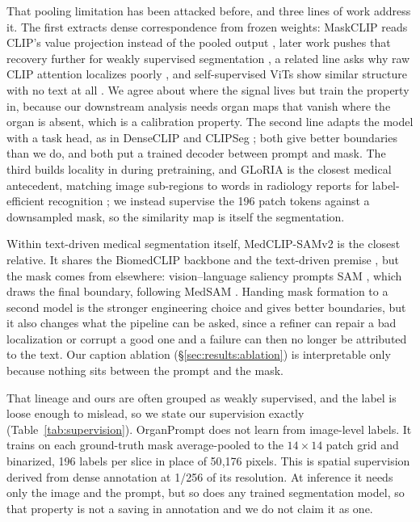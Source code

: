 \documentclass[10pt]{article}
\begin{document}
That pooling limitation has been attacked before, and three lines of work address
it. The first extracts dense correspondence from
frozen weights: MaskCLIP reads CLIP's value projection instead of the pooled
output \cite{zhou2022maskclip}, later work pushes that recovery further for weakly
supervised segmentation \cite{yang2025clipdense}, a related line asks why raw CLIP
attention localizes poorly \cite{li2024clipexplain}, and self-supervised ViTs show
similar structure with no text at all \cite{caron2021dino}. We agree about where
the signal lives but train the property in, because our downstream analysis needs
organ maps that vanish where the organ is absent, which is a calibration property.
The second line adapts the model with a task head, as in DenseCLIP
\cite{rao2022denseclip} and CLIPSeg \cite{lueddecke2022clipseg}; both give better
boundaries than we do, and both put a trained decoder between prompt and mask. The
third builds locality in during pretraining, and GLoRIA is the closest medical
antecedent, matching image sub-regions to words in radiology reports for
label-efficient recognition \cite{huang2021gloria}; we instead supervise the 196
patch tokens against a downsampled mask, so the similarity map is itself the
segmentation.

Within text-driven medical segmentation itself, MedCLIP-SAMv2 is the closest
relative. It shares the BiomedCLIP backbone and the
text-driven premise \cite{koleilat2025medclipsamv2, koleilat2024medclipsam}, but
the mask comes from elsewhere: vision--language saliency prompts SAM
\cite{kirillov2023sam}, which draws the final boundary, following MedSAM
\cite{ma2024medsam}. Handing mask formation to a second model is the stronger
engineering choice and gives better boundaries, but it also changes what the
pipeline can be asked, since a refiner can repair a bad localization or corrupt a
good one and a failure can then no longer be attributed to the text. Our caption
ablation (\S\ref{sec:results:ablation}) is interpretable only because nothing sits
between the prompt and the mask.

That lineage and ours are often grouped as weakly supervised, and the label is
loose enough to mislead, so we state our supervision exactly
(Table~\ref{tab:supervision}). OrganPrompt does not learn from image-level labels.
It trains on each ground-truth mask average-pooled to the $14\times14$ patch grid
and binarized, 196 labels per slice in place of 50{,}176 pixels. This is spatial supervision derived from dense annotation at 1/256 of its resolution. At
inference it needs only the image and the prompt, but so does any trained
segmentation model, so that property is not a saving in annotation and we do not
claim it as one.
\end{document}
